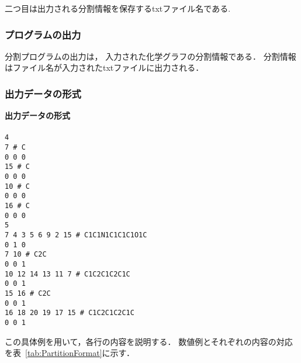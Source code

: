 \documentclass[11pt,titlepage,dvipdfmx,twoside]{jarticle}
\begin{document}
二つ目は出力される分割情報を保存するtxtファイル名である.
\bigskip

\subsubsection{プログラムの出力}
\label{sec:Output_p}

分割プログラムの出力は，
入力された化学グラフの分割情報である．
分割情報はファイル名が入力されたtxtファイルに出力される．

\subsubsection{出力データの形式}
\label{sec:OutputFormat_p}

\begin{oframed}
	{\bf 出力データの形式}\\\\
	{\tt 4 \\
	7 \# C \\
	0 0 0 \\
	15 \# C \\
	0 0 0 \\
	10 \# C \\
	0 0 0 \\
	16 \# C \\
	0 0 0 \\
	5 \\
	7 4 3 5 6 9 2 15 \# C1C1N1C1C1C1O1C \\
	0 1 0 \\
	7 10 \# C2C \\
	0 0 1 \\
	10 12 14 13 11 7 \# C1C2C1C2C1C \\
	0 0 1 \\
	15 16 \# C2C \\
	0 0 1 \\
	16 18 20 19 17 15 \# C1C2C1C2C1C \\
	0 0 1 \\}
	\end{oframed}

	この具体例を用いて，各行の内容を説明する．
	数値例とそれぞれの内容の対応を表~\ref{tab:PartitionFormat}に示す．
\end{document}
